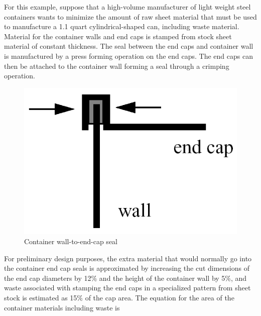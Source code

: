 For this example, suppose that a high-volume manufacturer of light
weight steel containers wants to minimize the amount of raw sheet
material that must be used to manufacture a 1.1 quart
cylindrical-shaped can, including waste material. Material for the
container walls and end caps is stamped from stock sheet material of
constant thickness. The seal between the end caps and container wall
is manufactured by a press forming operation on the end caps. The end
caps can then be attached to the container wall forming a seal through
a crimping operation.
\begin{figure}
  \centering
  \includegraphics[scale=0.4]{images/end_cap}
  \caption{Container wall-to-end-cap seal}
  \label{additional:figure01}
\end{figure}

For preliminary design purposes, the extra material that would
normally go into the container end cap seals is approximated by
increasing the cut dimensions of the end cap diameters by 12\% and the
height of the container wall by 5\%, and waste associated with
stamping the end caps in a specialized pattern from sheet stock is
estimated as 15\% of the cap area. The equation for the area of the
container materials including waste is

